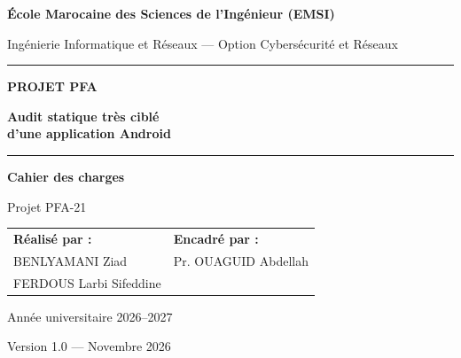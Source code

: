 \documentclass[11pt,a4paper]{article}
\begin{document}
\begin{titlepage}
\thispagestyle{empty}
\centering
{}


{\large\color{bleu}\textbf{École Marocaine des Sciences de l'Ingénieur (EMSI)}}\par
{\normalsize Ingénierie Informatique et Réseaux --- Option Cybersécurité et Réseaux}\par

\vspace{2.2cm}
{\color{bleu}\rule{\textwidth}{1.6pt}}\par
\vspace{0.6cm}
{\Large\bfseries\color{bleu} PROJET PFA}\par
\vspace{0.4cm}
{\huge\bfseries Audit statique très ciblé\\[4pt] d'une application Android}\par
\vspace{0.6cm}
{\color{bleu}\rule{\textwidth}{1.6pt}}\par

\vspace{1.2cm}
{\Large\bfseries Cahier des charges}\par
\vspace{0.3cm}
{\large Projet PFA-21}\par

\vfill

\begin{tabular}{p{7.2cm}p{7.2cm}}
\textbf{\color{bleu}\large Réalisé par :} & \textbf{\color{bleu}\large Encadré par :}\\[8pt]
BENLYAMANI Ziad & Pr. OUAGUID Abdellah\\
FERDOUS Larbi Sifeddine &\\
\end{tabular}

\vfill

{\normalsize Année universitaire 2026--2027}\par
{\normalsize Version 1.0 --- Novembre 2026}\par
\end{titlepage}

\tableofcontents
\clearpage
{}
\end{document}
